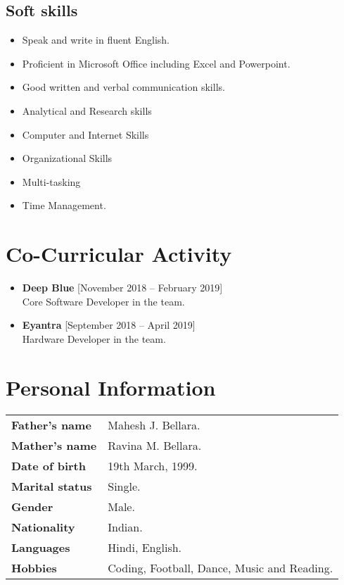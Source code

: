 \documentclass[11pt,a4paper]{moderncv}
\begin{document}
\subsection{\textbf{Soft skills}}
\begin{itemize}
	
	\item Speak and write in fluent English. 
	\item Proficient in Microsoft Office including Excel and Powerpoint.
	\item Good written and verbal communication skills. 
	\item Analytical and Research skills 
	\item Computer and Internet Skills
	\item Organizational Skills
	\item Multi-tasking
	\item Time Management.  
	
\end{itemize}
	
\section{Co-Curricular Activity}

\begin{itemize}
	
	\item \textbf{Deep Blue} \hfill [November 2018 -- February 2019] \\
	 Core Software Developer in the team.
	
	\item \textbf{Eyantra} \hfill [September 2018 -- April 2019] \\
	 Hardware Developer in the team.

\end{itemize}

\section{Personal Information}

\begin{tabular}{p{4cm}l}
\textbf{Father's name}         &   	Mahesh J. Bellara.\\
\textbf{Mather's name}         &   	Ravina M. Bellara.\\
\textbf{Date of birth}         &    19th March, 1999. \\
\textbf{Marital status}        &    Single.     \\
\textbf{Gender}                &    Male. \\
\textbf{Nationality}           &    Indian. \\
\textbf{Languages}             &    Hindi, English. \\
\textbf{Hobbies}               &    Coding, Football, Dance, Music and Reading.\\
\end{tabular}
\end{document}
